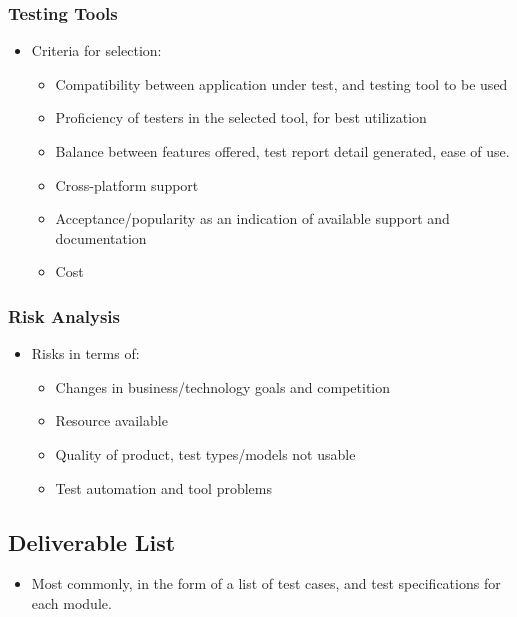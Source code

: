 \documentclass{article}
\begin{document}
\subsubsection{Testing Tools}
\begin{itemize}
    \item Criteria for selection:
    \begin{itemize}
        \item Compatibility between application under test, and testing tool to be used
        
        \item Proficiency of testers in the selected tool, for best utilization
        
        \item Balance between features offered, test report detail generated, ease of use. 
        
        \item Cross-platform support
        
        \item Acceptance/popularity as an indication of available support and documentation
        
        \item Cost
    \end{itemize}
\end{itemize}

\subsubsection{Risk Analysis}
\begin{itemize}
    \item Risks in terms of:
    \begin{itemize}
        \item Changes in business/technology goals and competition
        
        \item Resource available
        
        \item Quality of product, test types/models not usable
        
        \item Test automation and tool problems
    \end{itemize}
\end{itemize}

\subsection{Deliverable List}
\begin{itemize}
    \item Most commonly, in the form of a list of test cases, and test specifications for each module. 
\end{itemize}
\end{document}
